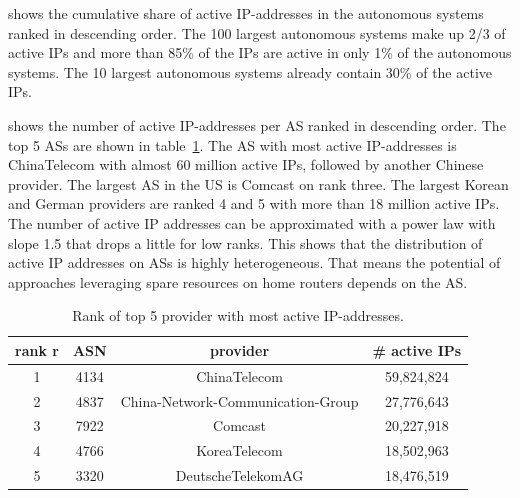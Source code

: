 
 shows the cumulative share of active IP-addresses in the autonomous systems ranked in descending order.
The 100 largest autonomous systems make up 2/3 of active IPs and more than 85\% of the IPs are active in only 1\% of the autonomous systems. The 10 largest autonomous systems already contain 30\% of the active IPs.

 shows the number of active IP-addresses per AS ranked in descending order.
The top 5 ASs are shown in table~\ref{tab:asrank}.
The AS with most active IP-addresses is ChinaTelecom with almost 60 million active IPs, followed by another Chinese provider.
The largest AS in the US is Comcast on rank three.
The largest Korean and German providers are ranked 4 and 5 with more than 18 million active IPs.
The number of active IP addresses can be approximated with a power law with slope 1.5 that drops a little for low ranks.
This shows that the distribution of active IP addresses on ASs is highly heterogeneous.
That means the potential of approaches leveraging spare resources on home routers depends on the AS.

\begin{table}[tb]
\centering
\caption{Rank of top 5 provider with most active IP-addresses.}
\label{tab:asrank}
\begin{tabular}{|c|c|c|c|}
\hline
rank r & ASN & provider & \# active IPs  \\
\hline
1 & 4134 & ChinaTelecom & 59,824,824 \\
2 & 4837 & China-Network-Communication-Group & 27,776,643 \\
3 & 7922 & Comcast & 20,227,918 \\
4 & 4766 & KoreaTelecom & 18,502,963 \\
5 & 3320 & DeutscheTelekomAG & 18,476,519 \\
\hline
\end{tabular}
\end{table}
%

%
%
%
